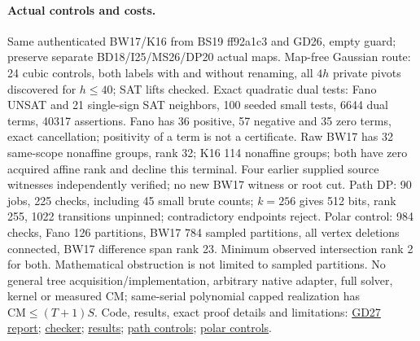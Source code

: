 \documentclass[11pt]{article}
\begin{document}
\paragraph{Actual controls and costs.}
Same authenticated BW17/K16 from BS19 ff92a1c3 and GD26, empty guard; preserve separate BD18/I25/MS26/DP20 actual maps. Map-free Gaussian route: 24 cubic controls, both labels with and without renaming, all $4h$ private pivots discovered for $h\le40$; SAT lifts checked. Exact quadratic dual tests: Fano UNSAT and 21 single-sign SAT neighbors, 100 seeded small tests, 6644 dual terms, 40317 assertions. Fano has 36 positive, 57 negative and 35 zero terms, exact cancellation; positivity of a term is not a certificate. Raw BW17 has 32 same-scope nonaffine groups, rank 32; K16 114 nonaffine groups; both have zero acquired affine rank and decline this terminal. Four earlier supplied source witnesses independently verified; no new BW17 witness or root cut. Path DP: 90 jobs, 225 checks, including 45 small brute counts; $k=256$ gives 512 bits, rank 255, 1022 transitions unpinned; contradictory endpoints reject. Polar control: 984 checks, Fano 126 partitions, BW17 784 sampled partitions, all vertex deletions connected, BW17 difference span rank 23. Minimum observed intersection rank 2 for both. Mathematical obstruction is not limited to sampled partitions. No general tree acquisition/implementation, arbitrary native adapter, full solver, kernel or measured CM; same-serial polynomial capped realization has $\mathrm{CM}\le(T+1)S$. Code, results, exact proof details and limitations: \href{https://github.com/j15marti/pnp/commit/89b2aa3af392b547848e355192325f12dff000cb}{GD27 report}; \href{https://github.com/j15marti/pnp/commit/f386058d5ce1949d6bfc6fc8a97233cea074566b}{checker}; \href{https://github.com/j15marti/pnp/commit/3e0992190b3c2704c22759a889f83641dec8ae1d}{results}; \href{https://github.com/j15marti/pnp/commit/46e02155363b7cc6fde4091eaff1a442d00b1e7c}{path controls}; \href{https://github.com/j15marti/pnp/commit/fd7a7d2af47d282fc849cd0bbf3fea99f44c0b89}{polar controls}.
\end{document}
